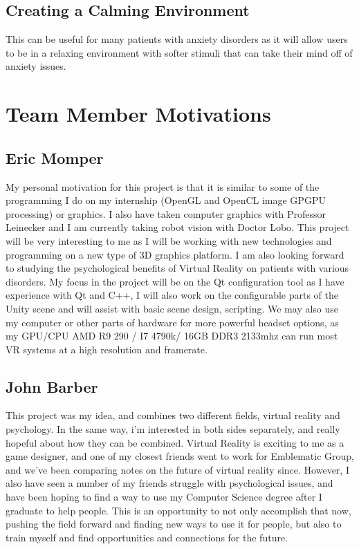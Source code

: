 \documentclass[a4paper,10pt]{article}
\begin{document}
	\subsection{Creating a Calming Environment}
	This can be useful for many patients with anxiety disorders as it will allow users to be in a relaxing environment with softer stimuli that can take their mind off of anxiety issues. 
	\pagebreak
	
	
	\section{Team Member Motivations}
	\subsection{Eric Momper}
	My personal motivation for this project is that it is similar to some of the programming I do on my internship (OpenGL and OpenCL image GPGPU processing) or graphics.
	I also have taken computer graphics with Professor Leinecker and I am currently taking robot vision with Doctor Lobo. This project will be very interesting to me as  
	I will be working with new technologies and programming on a new type of 3D graphics platform. I am also looking forward to studying the psychological benefits
	of Virtual Reality on patients with various disorders. My focus in the project will be on the Qt configuration tool as I have experience with Qt and C++, I will 
	also work on the configurable parts of the Unity scene and will assist with basic scene design, scripting. We may also use my computer or other parts of hardware for more powerful headset options, 
	as my GPU/CPU AMD R9 290 / I7 4790k/ 16GB DDR3 2133mhz can run most VR systems at a high resolution and framerate. 
	
	\subsection{John Barber}
	This project was my idea, and combines two different fields, virtual reality and psychology.  In the same way, i'm interested in both 
	sides separately, and really hopeful about how they can be combined.  Virtual Reality is exciting to me as a game designer, 
	and one of my closest friends went to work for Emblematic Group, and we've been comparing notes on the future of virtual reality since.  
	However, I also have seen a number of my friends struggle with psychological issues, and have been hoping to find a way to use my Computer 
	Science degree after I graduate to help people.  This is an opportunity to not only accomplish that now, pushing the field forward and finding 
	new ways to use it for people, but also to train myself and find opportunities and connections for the future.
\end{document}

